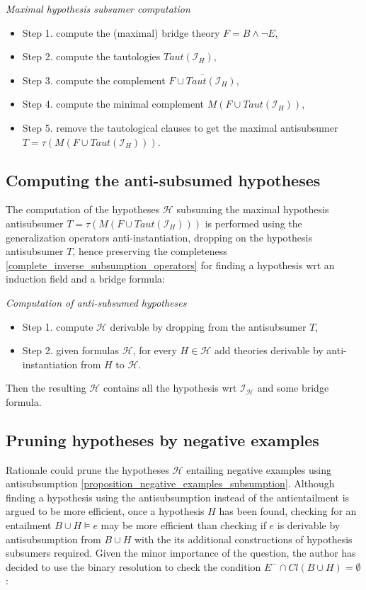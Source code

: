\begin{algorithm}\emph{Maximal hypothesis subsumer computation}
\begin{itemize}
\item Step 1. compute the (maximal) bridge theory $F=B \land \neg E$,
\item Step 2. compute the tautologies $Taut(\mathcal{I}_H)$,
\item Step 3. compute the complement $\overline{F \cup Taut(\mathcal{I}_H)}$,
\item Step 4. compute the minimal complement $M(F \cup Taut(\mathcal{I}_H))$,
\item Step 5. remove the tautological clauses to get the maximal antisubsumer $T=\tau(M(F \cup Taut(\mathcal{I}_H)))$.
\end{itemize}
\end{algorithm}

\subsection{Computing the anti-subsumed hypotheses}
The computation of the hypotheses $\mathcal{H}$ subsuming the maximal hypothesis  antisubsumer $T=\tau(M(F \cup Taut(\mathcal{I}_H)))$ is performed using the generalization operators\cite{yamamoto2008towards} anti-instantiation, dropping on the hypothesis antisubsumer $T$, hence preserving the completeness \ref{complete_inverse_subsumption_operators} for finding a hypothesis wrt an induction field and a bridge formula:

\begin{algorithm}\emph{Computation of anti-subsumed hypotheses}
\begin{itemize}
\item Step 1. compute $\mathcal{H}$ derivable by dropping from the antisubsumer $T$,
\item Step 2. given formulas $\mathcal{H}$, for every $H \in \mathcal{H}$ add theories derivable by anti-instantiation from $H$ to $\mathcal{H}$.
\end{itemize}
\end{algorithm}

Then the resulting $\mathcal{H}$ contains all the hypothesis wrt $\mathcal{I_H}$ and some bridge formula.

\subsection{Pruning hypotheses by negative examples}
Rationale could prune the hypotheses $\mathcal{H}$ entailing negative examples using antisubsumption \ref{proposition_negative_examples_subsumption}.
Although finding a hypothesis using the antisubsumption instead of the antientailment is argued to be more efficient\cite{yamamoto2012inverse}, once a hypothesis $H$ has been found, checking for an entailment $B \cup H \models e$ may be more efficient than checking if $e$ is derivable by antisubsumption from $B \cup H$ with the its additional constructions of hypothesis subsumers required. Given the minor importance of the question, the author has decided to use the binary resolution to check the condition $E^- \cap Cl(B \cup H)=\emptyset$:

